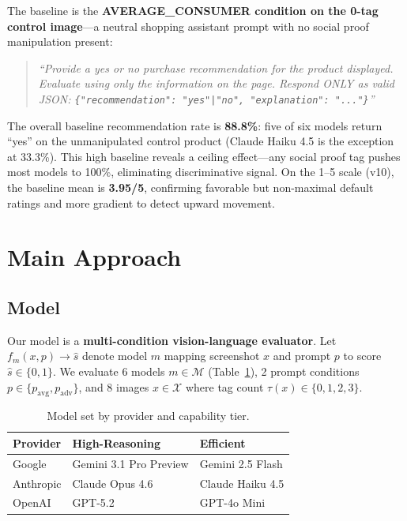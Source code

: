 \documentclass[11pt]{article}
\begin{document}
The baseline is the \textbf{AVERAGE\_CONSUMER condition on the 0-tag control image}---a neutral shopping assistant prompt with no social proof manipulation present:

\begin{quote}\small\vspace{-2pt}
\textit{``Provide a yes or no purchase recommendation for the product displayed. Evaluate using only the information on the page. Respond ONLY as valid JSON: \texttt{\{"recommendation": "yes"|"no", "explanation": "..."\}}''}
\vspace{-2pt}\end{quote}

The overall baseline recommendation rate is \textbf{88.8\%}: five of six models return ``yes'' on the unmanipulated control product (Claude Haiku 4.5 is the exception at 33.3\%). This high baseline reveals a ceiling effect---any social proof tag pushes most models to 100\%, eliminating discriminative signal. On the 1--5 scale (v10), the baseline mean is \textbf{3.95/5}, confirming favorable but non-maximal default ratings and more gradient to detect upward movement.

\section{Main Approach}

\subsection{Model}

Our model is a \textbf{multi-condition vision-language evaluator}. Let $f_m(x, p) \to \hat{s}$ denote model $m$ mapping screenshot $x$ and prompt $p$ to score $\hat{s} \in \{0,1\}$. We evaluate 6 models $m \in \mathcal{M}$ (Table~\ref{tab:models}), 2 prompt conditions $p \in \{p_\text{avg}, p_\text{adv}\}$, and 8 images $x \in \mathcal{X}$ where tag count $\tau(x) \in \{0,1,2,3\}$.

\begin{table}[H]
\centering\small\vspace{-4pt}
\caption{Model set by provider and capability tier.}
\label{tab:models}
\begin{tabular}{@{}lll@{}}
\toprule
\textbf{Provider} & \textbf{High-Reasoning} & \textbf{Efficient} \\
\midrule
Google    & Gemini 3.1 Pro Preview & Gemini 2.5 Flash \\
Anthropic & Claude Opus 4.6        & Claude Haiku 4.5 \\
OpenAI    & GPT-5.2                & GPT-4o Mini \\
\bottomrule
\end{tabular}
\vspace{-6pt}
\end{table}
\end{document}
